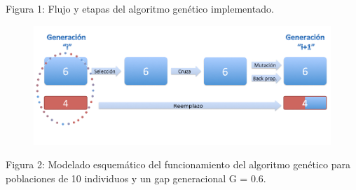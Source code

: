 \documentclass[%
    final,
    reprint,
    notitlepage,
    narroweqnarray,
    inline,
    twoside,
    invited
    ]{ieee}
\begin{document}
\begin{center}
\par Figura 1: Flujo y etapas del algoritmo genético implementado.
\end{center}

\begin{figure}[H]
\begin{center}
\includegraphics[scale=1.90]{./images/AlgGenModelado.png}
\label{modelado}
\end{center}
\end{figure}

\begin{center}
\par Figura 2: Modelado esquemático del funcionamiento del algoritmo genético para poblaciones de 10 individuos y un gap generacional G = 0.6.
\end{center}


\clearpage
\end{document}
